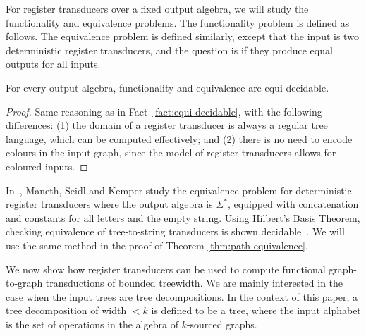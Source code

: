 For register transducers over  a fixed  output algebra, we will study the functionality and equivalence problems.  The functionality problem is defined as follows.
The equivalence problem is defined similarly, except that the input is two deterministic register transducers, and the question is if they produce equal outputs for all inputs. 
\begin{fact}
    For every output algebra,  functionality and equivalence  are equi-decidable.
\end{fact}
\begin{proof}
    Same reasoning as in Fact~\ref{fact:equi-decidable}, with the following differences: (1) the domain of a register transducer is always a regular tree language, which can be computed effectively; and  (2) there is no need to encode colours in the input graph, since the model of register transducers allows for coloured inputs.
\end{proof}

\begin{example} In~\cite{seidlManethKemper2018}, Maneth, Seidl and Kemper study  the equivalence problem for  deterministic register transducers where the output algebra is $\Sigma^*$, equipped with concatenation and constants for all letters and the empty string.  Using Hilbert's Basis Theorem, checking equivalence of tree-to-string transducers is shown decidable~\cite[Corollary 8.2]{seidlManethKemper2018}. We will use the same method in the proof of Theorem \ref{thm:path-equivalence}.
\end{example}


 We now show how register transducers can be used to compute functional graph-to-graph \mso transductions of bounded treewidth.
We are mainly interested in the case when the input trees are tree decompositions. In the context of this paper, a tree decomposition of width $<k$ is defined to be a tree, where the input alphabet is the set of operations in the algebra of $k$-sourced graphs. 

